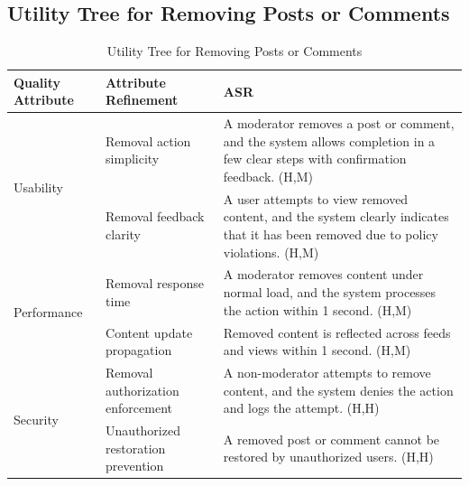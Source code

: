 \documentclass{article}
\begin{document}
\subsection{Utility Tree for Removing Posts or Comments}

\begin{table}[H]
    \centering
    \caption{Utility Tree for Removing Posts or Comments}
    \begin{tabular}{|p{3cm}|p{4cm}|p{7cm}|}
        \hline
        \textbf{Quality Attribute} & \textbf{Attribute Refinement}                                                                                                      & \textbf{ASR} \\
        \hline

        \multirow{2}{*}{Usability}
                                   & Removal action simplicity
                                   & A moderator removes a post or comment, and the system allows completion in a few clear steps with confirmation feedback. (H,M)                    \\
        \cline{2-3}
                                   & Removal feedback clarity
                                   & A user attempts to view removed content, and the system clearly indicates that it has been removed due to policy violations. (H,M)                \\
        \hline

        \multirow{2}{*}{Performance}
                                   & Removal response time
                                   & A moderator removes content under normal load, and the system processes the action within 1 second. (H,M)                                         \\
        \cline{2-3}
                                   & Content update propagation
                                   & Removed content is reflected across feeds and views within 1 second. (H,M)                                                                        \\
        \hline

        \multirow{2}{*}{Security}
                                   & Removal authorization enforcement
                                   & A non-moderator attempts to remove content, and the system denies the action and logs the attempt. (H,H)                                          \\
        \cline{2-3}
                                   & Unauthorized restoration prevention
                                   & A removed post or comment cannot be restored by unauthorized users. (H,H)                                                                         \\
        \hline


\end{tabular}
\end{table}
\end{document}
